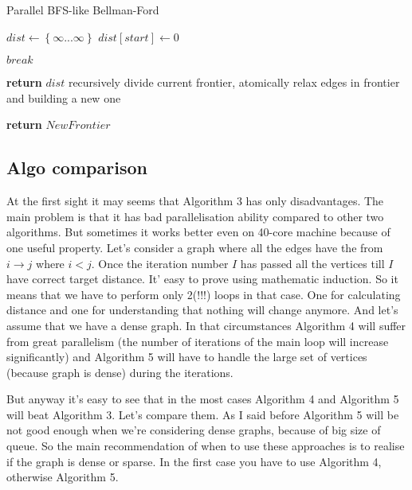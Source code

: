 \FloatBarrier
\begin{algorithm}
\caption{Parallel BFS-like Bellman-Ford}\label{bf_bfs_par}
\begin{algorithmic}[1]
\State $dist\gets \left\{ {\infty ... \infty}\right\}$
\State $dist[start] \gets 0$
	  
	
		\State $break$						
	\EndIf
		
		
\EndFor
\State \textbf{return} $dist$
\EndProcedure
\State
{}
\State recursively divide current frontier, atomically relax edges in frontier and building a new one

\State \textbf{return} $NewFrontier$
\EndProcedure

\end{algorithmic}
\end{algorithm}


\FloatBarrier
\subsection{Algo comparison}
At the first sight it may seems that Algorithm 3 has only disadvantages. The main problem is that it has bad parallelisation ability compared to other two algorithms. But sometimes it works better even on 40-core machine because of one useful property. Let's consider a graph where all the edges have the from $i \rightarrow j$ where $i < j$. Once the iteration number $I$ has passed all the vertices till $I$ have correct target distance. It' easy to prove using mathematic induction. So it means that we have to perform only 2(!!!) loops in that case. One for calculating distance and one for understanding that nothing will change anymore. And let's assume that we have a dense graph. In that circumstances Algorithm 4 will suffer from great parallelism (the number of iterations of the main loop will increase significantly) and Algorithm 5 will have to handle the large set of vertices (because graph is dense) during the iterations. 

But anyway it's easy to see that in the most cases Algorithm 4 and Algorithm 5 will beat Algorithm 3. Let's compare them. As I said before Algorithm 5 will be not good enough when we're considering dense graphs, because of big size of queue. So the main recommendation of when to use these approaches is to realise if the graph is dense or sparse. In the first case you have to use Algorithm 4, otherwise Algorithm 5.


